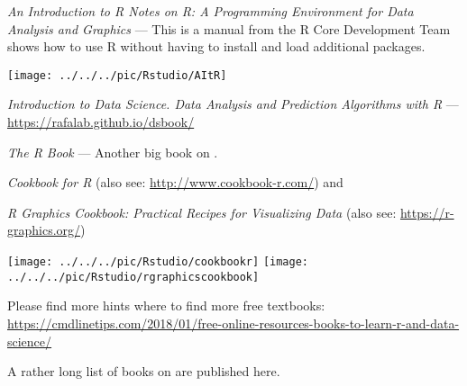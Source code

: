 {\begin{minipage}{0.7\textwidth}
	\item[\cite{Venables2022Introduction}] \textit{An Introduction to R
		Notes on R: A Programming Environment for Data Analysis and Graphics} --- This is a manual from the R Core Development Team shows how to use R without having to install and load additional packages. 
\end{minipage}
\begin{minipage}{0.3\textwidth}
	\begin{center}
		\texttt{[image: ../../../pic/Rstudio/AItR]}
	\end{center}
\end{minipage}


\begin{minipage}{0.6\textwidth}
		\item[\cite{Irizarry2020Introduction} ] \textit{Introduction to Data Science. Data Analysis and Prediction Algorithms with R} --- \websmall\url{https://rafalab.github.io/dsbook/}
		
	\item[\cite{Crawley2013R} ] \textit{The R Book} --- Another big book on \R.
	

\end{minipage}

\begin{minipage}{0.3\textwidth}
	\item[\cite{Teetor2011R} ] \textit{Cookbook for R} (also see: \websmall\url{http://www.cookbook-r.com/}) and \item[\textbf{\cite{Chang2018R}}]  \textit{R Graphics Cookbook: Practical Recipes for Visualizing Data} (also see: \websmall\url{https://r-graphics.org/})
\end{minipage}
\begin{minipage}{0.7\textwidth}
	\begin{center}
		\texttt{[image: ../../../pic/Rstudio/cookbookr]}
		\texttt{[image: ../../../pic/Rstudio/rgraphicscookbook]}
	\end{center}
\end{minipage}
\item[Various free textbooks] Please find more hints where to find more free textbooks: \websmall\url{https://cmdlinetips.com/2018/01/free-online-resources-books-to-learn-r-and-data-science/}
\item[\websmall\url{https://bookdown.org/}] A rather long list of books on \R are published here.
}
 
